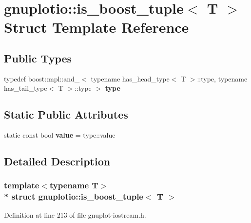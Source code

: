 \hypertarget{structgnuplotio_1_1is__boost__tuple}{}\section{gnuplotio\+:\+:is\+\_\+boost\+\_\+tuple$<$ T $>$ Struct Template Reference}
\label{structgnuplotio_1_1is__boost__tuple}
\subsection*{Public Types}
\begin{DoxyCompactItemize}
\item 
typedef boost\+::mpl\+::and\+\_\+$<$ typename has\+\_\+head\+\_\+type$<$ T $>$\+::type, typename has\+\_\+tail\+\_\+type$<$ T $>$\+::type $>$ {\bfseries type}\hypertarget{structgnuplotio_1_1is__boost__tuple_ad771f62833b23ecae5dc689e6248396a}{}\label{structgnuplotio_1_1is__boost__tuple_ad771f62833b23ecae5dc689e6248396a}

\end{DoxyCompactItemize}
\subsection*{Static Public Attributes}
\begin{DoxyCompactItemize}
\item 
static const bool {\bfseries value} = type\+::value\hypertarget{structgnuplotio_1_1is__boost__tuple_ae6664b02421d28585204104af65a4744}{}\label{structgnuplotio_1_1is__boost__tuple_ae6664b02421d28585204104af65a4744}

\end{DoxyCompactItemize}


\subsection{Detailed Description}
\subsubsection*{template$<$typename T$>$\\*
struct gnuplotio\+::is\+\_\+boost\+\_\+tuple$<$ T $>$}



Definition at line 213 of file gnuplot-\/iostream.\+h.

